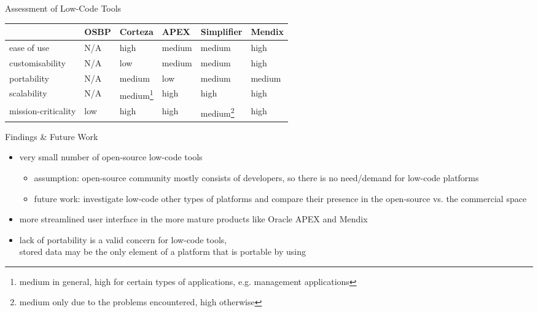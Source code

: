 \documentclass[aspectratio=169]{beamer}
\begin{document}
  \begin{frame}{Assessment of Low-Code Tools}
    \begin{table}[]
    \begin{tabular}{l|l|l|l|l|l|}
    \cline{2-6}
                                           & \textbf{OSBP} & \textbf{Corteza} & \textbf{APEX}   & \textbf{Simplifier} & \textbf{Mendix} \\ \hline
    \multicolumn{1}{|l|}{ease of use}      & N/A  & high    & medium & medium     & high   \\ \hline
    \multicolumn{1}{|l|}{customisability}  & N/A  & low     & medium & medium     & high   \\ \hline
    \multicolumn{1}{|l|}{portability}      & N/A  & medium  & low    & medium     & medium \\ \hline
    \multicolumn{1}{|l|}{scalability}      & N/A  & medium\footnote{medium in general, high for certain types of applications, e.g. management applications} & high   & high       & high   \\ \hline
    \multicolumn{1}{|l|}{mission-criticality} & low  & high    & high   & medium\footnote{medium only due to the problems encountered, high otherwise}    & high   \\ \hline
    \end{tabular}
    \end{table}
  \end{frame}

  \begin{frame}{Findings \& Future Work}
    \begin{itemize}
      \item very small number of open-source low-code tools
        \begin{itemize}
          \item assumption: open-source community mostly consists of developers, so there is no need/demand for low-code platforms
          \item future work: investigate low-code other types of platforms and compare their presence in the open-source vs. the commercial space
        \end{itemize}
      \item more streamlined user interface in the more mature products like Oracle APEX and Mendix
      \item lack of portability is a valid concern for low-code tools, \\
            stored data may be the only element of a platform that is portable by using
    \end{itemize}
  \end{frame}
\end{document}
